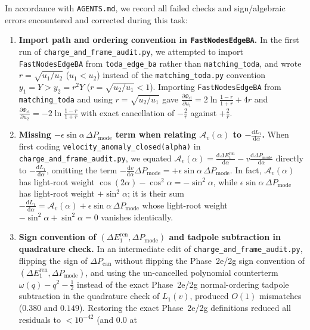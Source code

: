 \documentclass[11pt,a4paper]{article}
\newcommand{\dd}{\mathrm{d}}
\begin{document}
In accordance with \texttt{AGENTS.md}, we record all failed checks and sign/algebraic
errors encountered and corrected during this task:
\begin{enumerate}
\item \textbf{Import path and ordering convention in \texttt{FastNodesEdgeBA}.}
In the first run of \texttt{charge\_and\_frame\_audit.py}, we attempted to import
\texttt{FastNodesEdgeBA} from \texttt{toda\_edge\_ba} rather than
\texttt{matching\_toda}, and wrote $r = \sqrt{u_1/u_2}$ ($u_1 < u_2$) instead of
the \texttt{matching\_toda.py} convention $y_1 = Y > y_2 = r^2 Y$ ($r = \sqrt{u_2/u_1} < 1$).
Importing \texttt{FastNodesEdgeBA} from \texttt{matching\_toda} and using
$r = \sqrt{u_2/u_1}$ gave $\frac{\partial\Phi_{\mathrm{cl}}}{\partial u_1} = 2\ln\frac{1-r}{1+r} + 4r$
and $\frac{\partial\Phi_{\mathrm{cl}}}{\partial u_2} = -2\ln\frac{1-r}{1+r}$ with
exact cancellation of $-\frac{2}{r}$ against $+\frac{2}{r}$.
\item \textbf{Missing $-\epsilon\sin\alpha\,\Delta P_{\mathrm{mode}}$ term when relating $\mathcal{A}_v(\alpha)$ to $-\frac{\dd L_1}{\dd\alpha}$.}
When first coding \texttt{velocity\_anomaly\_closed(alpha)} in
\texttt{charge\_and\_frame\_audit.py}, we equated $\mathcal{A}_v(\alpha) = \frac{\dd\Delta E_1^{\mathrm{ren}}}{\dd\alpha} - v\frac{\dd\Delta P_{\mathrm{mode}}}{\dd\alpha}$
directly to $-\frac{\dd L_1}{\dd\alpha}$, omitting the term
$-\frac{\dd v}{\dd\alpha}\Delta P_{\mathrm{mode}} = +\epsilon\sin\alpha\,\Delta P_{\mathrm{mode}}$.
In fact, $\mathcal{A}_v(\alpha)$ has light-root weight $\cos(2\alpha)-\cos^2\alpha = -\sin^2\alpha$,
while $\epsilon\sin\alpha\,\Delta P_{\mathrm{mode}}$ has light-root weight
$+\sin^2\alpha$; it is their sum $-\frac{\dd L_1}{\dd\alpha} = \mathcal{A}_v(\alpha) + \epsilon\sin\alpha\,\Delta P_{\mathrm{mode}}$
whose light-root weight $-\sin^2\alpha + \sin^2\alpha = 0$ vanishes identically.
\item \textbf{Sign convention of $(\Delta E_1^{\mathrm{ren}},\Delta P_{\mathrm{mode}})$ and tadpole subtraction in quadrature check.}
In an intermediate edit of \texttt{charge\_and\_frame\_audit.py}, flipping the
sign of $\Delta P_{\mathrm{can}}$ without flipping the Phase~2e/2g sign convention
of $(\Delta E_1^{\mathrm{ren}},\Delta P_{\mathrm{mode}})$, and using the
un-cancelled polynomial counterterm $\omega(q) - q^2 - \frac{1}{2}$ instead of the
exact Phase~2e/2g normal-ordering tadpole subtraction in the quadrature check of
$L_1(v)$, produced $O(1)$ mismatches ($0.380$ and $0.149$). Restoring the exact
Phase~2e/2g definitions reduced all residuals to $< 10^{-42}$ (and $0.0$ at

\end{enumerate}
\end{document}
